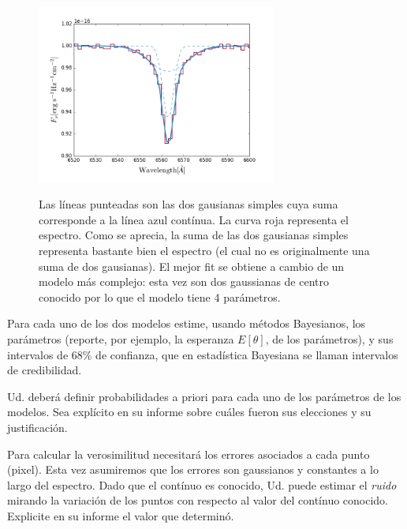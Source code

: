 \documentclass[letter, 11pt]{article}
\begin{document}
\begin{figure}[!ht]
  \centering
  \includegraphics[width=0.7\textwidth]{spectrum.png}
  \label{fig:linea}
  \caption{Las líneas punteadas son las dos gausianas simples cuya suma
    corresponde a la línea azul contínua. La curva roja representa el espectro.
    Como se aprecia, la suma de las dos gausianas simples representa bastante
    bien el espectro (el cual no es originalmente una suma de dos gausianas).
    El mejor fit se obtiene a cambio de un modelo más complejo: esta vez son dos
    gaussianas de centro conocido por lo que el modelo tiene 4 parámetros.}
\end{figure}

Para cada uno de los dos modelos estime, usando métodos Bayesianos, los
parámetros (reporte, por ejemplo, la esperanza $E[\theta]$, de los parámetros),
y sus intervalos de 68\% de confianza, que en estadística Bayesiana se llaman
intervalos de credibilidad.

\begin{ayuda}
  \small

  Ud. deberá definir probabilidades a priori para cada uno de los parámetros de
  los modelos. Sea explícito en su informe sobre cuáles fueron sus elecciones
  y su justificación.

  \vspace{0.5em}

  Para calcular la verosimilitud necesitará los errores asociados a cada punto
  (pixel).  Esta vez asumiremos que los errores son gaussianos y constantes a
  lo largo del espectro. Dado que el contínuo es conocido, Ud. puede estimar el
  \emph{ruido} mirando la variación de los puntos con respecto al valor del
  contínuo conocido. Explicite en su informe el valor que determinó.

\end{ayuda}
\end{document}
